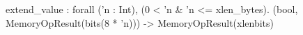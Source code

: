 extend_value : forall ('n : Int), (0 < 'n & 'n <= xlen_bytes).
  (bool, MemoryOpResult(bits(8 * 'n))) -> MemoryOpResult(xlenbits)